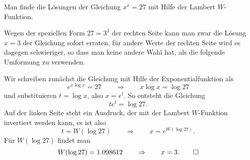 Man finde die Lösungen der Gleichung $x^x=27$ mit Hilfe der Lambert
$W$-Funktion.

\begin{loesung}
Wegen der speziellen Form $27=3^3$ der rechten Seite kann man
zwar die Lösung $x=3$ der Gleichung sofort erraten, für andere 
Werte der rechten Seite wird es dagegen schwieriger, so dass man
keine andere Wahl hat, als die folgende Umformung zu verwenden.

Wir schreiben zunächst die Gleichung mit Hilfe der Exponentialfunktion als
\[
e^{x\log x} = 27
\qquad\Rightarrow\qquad
x\log x = \log 27
\]
und substituieren $t=\log x$, also $x=e^t$. 
So entsteht die Gleichung
\[
te^t = \log 27.
\]
Auf der linken Seite steht ein Ausdruck, der mit der Lambert $W$-Funktion
invertiert werden kann, es ist also
\[
t = W(\log 27)
\qquad\Rightarrow\qquad
x=e^{W(\log 27)}.
\]
Für $W(\log 27)$ findet man
\[
W(\log 27) = 1.098612
\qquad\Rightarrow\qquad
x=3.
\qedhere
\]
\end{loesung}
